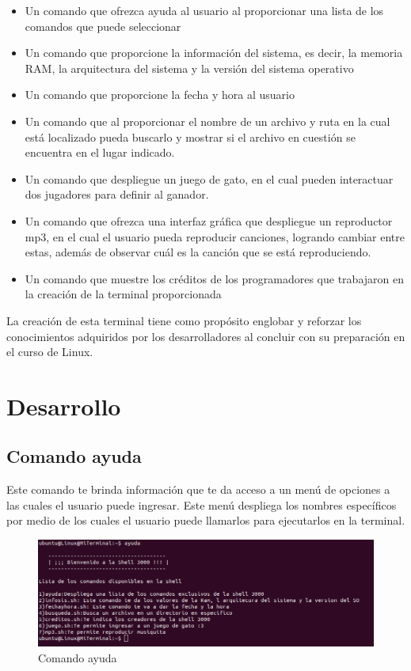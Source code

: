 \documentclass[12pt,a4paper]{article}
\begin{document}
\begin{itemize}
    \item Un comando que ofrezca ayuda al usuario al proporcionar una lista de los comandos que puede seleccionar
    \item Un comando que proporcione la información del sistema, es decir, la memoria RAM, la arquitectura del sistema y la versión del sistema operativo
    \item Un comando que proporcione la fecha y hora al usuario 
    \item Un comando que al proporcionar el nombre de un archivo y ruta en la cual está localizado pueda buscarlo y mostrar si el archivo en cuestión se encuentra en el lugar indicado.
    \item Un comando que despliegue un juego de gato, en el cual pueden interactuar dos jugadores para definir al ganador.
    \item Un comando que ofrezca una interfaz gráfica que despliegue un reproductor mp3, en el cual el usuario pueda reproducir canciones, logrando cambiar entre estas, además de observar cuál es la canción que se está reproduciendo.
    \item Un comando que muestre los créditos de los programadores que trabajaron en la creación de la terminal proporcionada
\end{itemize}

\noindent La creación de esta terminal tiene como propósito englobar y reforzar los conocimientos adquiridos por los desarrolladores al concluir con su preparación en el curso de Linux.

\newpage
\section{Desarrollo}

\subsection{Comando ayuda}
\noindent Este comando te brinda información que te da acceso a un menú de opciones a las cuales el usuario puede ingresar. Este menú despliega los nombres específicos por medio de los cuales el usuario puede llamarlos para ejecutarlos en la terminal.

\begin{figure}[H]
    \centering
    \includegraphics[width=\textwidth]{img/1.png}
    \caption{Comando ayuda}
    \label{Ayuda}
\end{figure}
\end{document}
